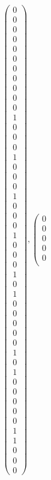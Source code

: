 \documentclass[8pt]{article}
\begin{document}
 \newline \begin{align*}
 \left(\begin{array}{r}
0 \\
0 \\
0 \\
0 \\
0 \\
0 \\
0 \\
0 \\
0 \\
0 \\
0 \\
1 \\
0 \\
0 \\
0 \\
1 \\
0 \\
0 \\
0 \\
1 \\
0 \\
0 \\
0 \\
1 \\
0 \\
0 \\
0 \\
1 \\
0 \\
1 \\
0 \\
0 \\
0 \\
0 \\
0 \\
1 \\
0 \\
1 \\
0 \\
0 \\
0 \\
0 \\
0 \\
1 \\
1 \\
0 \\
0 \\
0
\end{array}\right) ,
 \left(\begin{array}{r}
0 \\
0 \\
0 \\
0 \\
0 \\

\end{array}
\end{align*}
\end{document}
